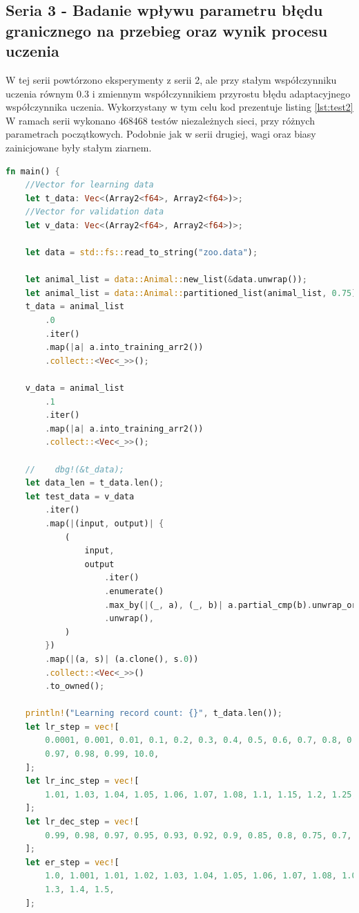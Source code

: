 \documentclass[12pt,twoside]{article}
\begin{document}
\clearpage
\subsection{Seria 3 - Badanie wpływu parametru błędu granicznego na przebieg oraz wynik procesu uczenia}
W tej serii powtórzono eksperymenty z serii 2, ale przy stałym współczynniku uczenia równym 0.3 i zmiennym współczynnikiem przyrostu błędu adaptacyjnego współczynnika uczenia.
Wykorzystany w tym celu kod prezentuje listing \ref{lst:test2}
W ramach serii wykonano 468468 testów niezależnych sieci, przy różnych parametrach początkowych.
Podobnie jak w serii drugiej, wagi oraz biasy zainicjowane były stałym ziarnem.

\begin{lstlisting}[language=Rust,caption=Kod wykorzystany do przeprowadzenia 3 serii eksperymentów,label={lst:test2}]
	fn main() {
    //Vector for learning data
    let t_data: Vec<(Array2<f64>, Array2<f64>)>;
    //Vector for validation data
    let v_data: Vec<(Array2<f64>, Array2<f64>)>;

    let data = std::fs::read_to_string("zoo.data");

    let animal_list = data::Animal::new_list(&data.unwrap());
    let animal_list = data::Animal::partitioned_list(animal_list, 0.75);
    t_data = animal_list
        .0
        .iter()
        .map(|a| a.into_training_arr2())
        .collect::<Vec<_>>();

    v_data = animal_list
        .1
        .iter()
        .map(|a| a.into_training_arr2())
        .collect::<Vec<_>>();

    //    dbg!(&t_data);
    let data_len = t_data.len();
    let test_data = v_data
        .iter()
        .map(|(input, output)| {
            (
                input,
                output
                    .iter()
                    .enumerate()
                    .max_by(|(_, a), (_, b)| a.partial_cmp(b).unwrap_or(std::cmp::Ordering::Equal))
                    .unwrap(),
            )
        })
        .map(|(a, s)| (a.clone(), s.0))
        .collect::<Vec<_>>()
        .to_owned();

    println!("Learning record count: {}", t_data.len());
    let lr_step = vec![
        0.0001, 0.001, 0.01, 0.1, 0.2, 0.3, 0.4, 0.5, 0.6, 0.7, 0.8, 0.9, 0.92, 0.94, 0.95, 0.96,
        0.97, 0.98, 0.99, 10.0,
    ];
    let lr_inc_step = vec![
        1.01, 1.03, 1.04, 1.05, 1.06, 1.07, 1.08, 1.1, 1.15, 1.2, 1.25, 1.3, 1.4,
    ];
    let lr_dec_step = vec![
        0.99, 0.98, 0.97, 0.95, 0.93, 0.92, 0.9, 0.85, 0.8, 0.75, 0.7, 0.65, 0.6,
    ];
    let er_step = vec![
        1.0, 1.001, 1.01, 1.02, 1.03, 1.04, 1.05, 1.06, 1.07, 1.08, 1.09, 1.1, 1.15, 1.2, 1.25,
        1.3, 1.4, 1.5,
    ];


\end{lstlisting}
\end{document}
